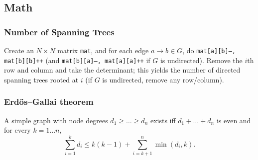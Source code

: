 \subsection{Math}
	\subsubsection{Number of Spanning Trees}
		Create an $N\times N$ matrix \texttt{mat}, and for each edge $a \rightarrow b \in G$, do
		\texttt{mat[a][b]--, mat[b][b]++} (and \texttt{mat[b][a]--, mat[a][a]++} if $G$ is undirected).
		Remove the $i$th row and column and take the determinant; this yields the number of directed spanning trees rooted at $i$
		(if $G$ is undirected, remove any row/column).

	\subsubsection{Erdős–Gallai theorem}
		A simple graph with node degrees $d_1 \ge \dots \ge d_n$ exists iff $d_1 + \dots + d_n$ is even and for every $k = 1\dots n$,
		\[ \sum _{i=1}^{k}d_{i}\leq k(k-1)+\sum _{i=k+1}^{n}\min(d_{i},k). \]
